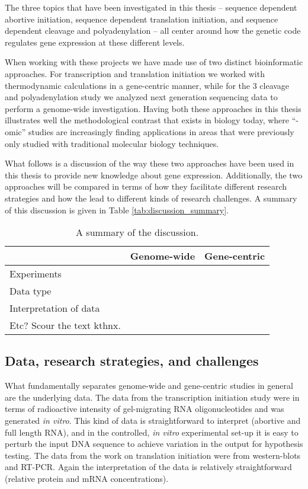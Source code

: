%
The three topics that have been investigated in this thesis -- sequence
dependent abortive initiation, sequence dependent translation initiation, and
sequence dependent cleavage and polyadenylation -- all center around how the
genetic code regulates gene expression at these different levels.

When working with these projects we have made use of two distinct bioinformatic
approaches. For transcription and translation initiation we worked with
thermodynamic calculations in a gene-centric manner, while for the 3\ppp
cleavage and polyadenylation study we analyzed next generation sequencing data
to perform a genome-wide investigation. Having both these approaches in this
thesis illustrates well the methodological contrast that exists in biology
today, where ``-omic'' studies are increasingly finding applications in areas
that were previously only studied with traditional molecular biology
techniques.

What follows is a discussion of the way these two approaches have been used in
this thesis to provide new knowledge about gene expression. Additionally, the
two approaches will be compared in terms of how they facilitate different
research strategies and how the lead to different kinds of research challenges.
A summary of this discussion is given in Table \ref{tab:discussion_summary}.

\begin{table}[hb]
	\begin{center}
		\begin{tabular}{lcc}
			\toprule
			 & Genome-wide & Gene-centric \\
			\midrule
			 Experiments &  &  \\
			 Data type &  &  \\
			 Interpretation of data &  &  \\
			 Etc? Scour the text kthnx. &  &  \\
		\end{tabular}
	\end{center}
	\caption{A summary of the discussion.}
\end{table}

\subsection{Data, research strategies, and challenges}
What fundamentally separates genome-wide and gene-centric studies in general
are the underlying data. The data from the transcription initiation study were
in terms of radioactive intensity of gel-migrating RNA oligonucleotides and was
generated \textit{in vitro}. This kind of data is straightforward to interpret
(abortive and full length RNA), and in the controlled, \textit{in vitro}
experimental set-up it is easy to perturb the input DNA sequence to achieve
variation in the output for hypothesis testing. The data from the work on
translation initiation were from western-blots and RT-PCR. Again the
interpretation of the data is relatively straightforward (relative protein and
mRNA concentrations).

